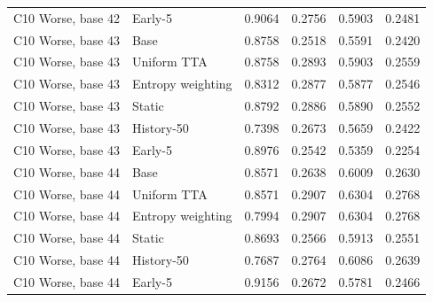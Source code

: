 \begin{tabular}{llrrrr}
C10 Worse, base 42 & Early-5 & 0.9064 & 0.2756 & 0.5903 & 0.2481 \\
C10 Worse, base 43 & Base & 0.8758 & 0.2518 & 0.5591 & 0.2420 \\
C10 Worse, base 43 & Uniform TTA & 0.8758 & 0.2893 & 0.5903 & 0.2559 \\
C10 Worse, base 43 & Entropy weighting & 0.8312 & 0.2877 & 0.5877 & 0.2546 \\
C10 Worse, base 43 & Static & 0.8792 & 0.2886 & 0.5890 & 0.2552 \\
C10 Worse, base 43 & History-50 & 0.7398 & 0.2673 & 0.5659 & 0.2422 \\
C10 Worse, base 43 & Early-5 & 0.8976 & 0.2542 & 0.5359 & 0.2254 \\
C10 Worse, base 44 & Base & 0.8571 & 0.2638 & 0.6009 & 0.2630 \\
C10 Worse, base 44 & Uniform TTA & 0.8571 & 0.2907 & 0.6304 & 0.2768 \\
C10 Worse, base 44 & Entropy weighting & 0.7994 & 0.2907 & 0.6304 & 0.2768 \\
C10 Worse, base 44 & Static & 0.8693 & 0.2566 & 0.5913 & 0.2551 \\
C10 Worse, base 44 & History-50 & 0.7687 & 0.2764 & 0.6086 & 0.2639 \\
C10 Worse, base 44 & Early-5 & 0.9156 & 0.2672 & 0.5781 & 0.2466 \\
\bottomrule
\end{tabular}
